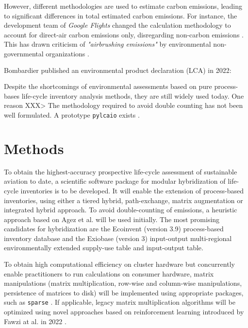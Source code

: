 \documentclass{article}
\begin{document}
    However, different methodologies are used to estimate carbon emissions, leading to significant differences in total estimated carbon emissions. For instance, the development team of \textit{Google Flights} changed the calculation methodology to account for direct-air carbon emissions only, disregarding non-carbon emissions \cite{ali_commit_2022}. This has drawn criticism of \textit{"airbrushing emissions"} by environmental non-governmental organizations \cite{hern_google_2022}\cite{rowlatt_google_2022}.
    
    Bombardier published an environmental product declaration (LCA) in 2022: \cite{noauthor_challenger_2022}
    
    
        Despite the shortcomings of environmental assessments based on pure process-bases life-cycle inventory analysis methods, they are still widely used today. One reason XXX> The methodology required to avoid double counting has not been well formulated. A prototype \texttt{pylcaio}\cite{noauthor_pylcaio_2022} exists .
    
\section{Methods}

    To obtain the highest-accuracy prospective life-cycle assessment of sustainable aviation to date, a scientific software package for modular hybridization of life-cycle inventories is to be developed. It will enable the extension of process-based inventories, using either a tiered hybrid, path-exchange, matrix augmentation or integrated hybrid \cite{hauschild_life_2015}\cite{hauschild_life_2018}\cite{crawford_hybrid_2018} approach. To avoid double-counting of emissions, a heuristic approach based on Agez et al. \cite{agez_lifting_2019}\cite{agez_correcting_2022}\cite{agez_hybridization_2020} will be used initially. The most promising candidates for hybridization are the Ecoinvent (version 3.9) process-based inventory database and the Exiobase (version 3) input-output multi-regional environmentally extended supply-use  table and input-output table.
    
    To obtain high computational efficiency on cluster hardware but concurrently enable practitioners to run calculations on consumer hardware, matrix manipulations (matrix multiplication, row-wise and column-wise manipulations, persistence of matrices to disk) will be implemented using appropriate packages, such as \texttt{sparse} \cite{abbasi_sparse_2018}. If applicable, legacy matrix multiplication algorithms will be optimized using novel approaches based on reinforcement learning introduced by Fawzi at al. in 2022 \cite{fawzi_discovering_2022}.
    
\end{document}
